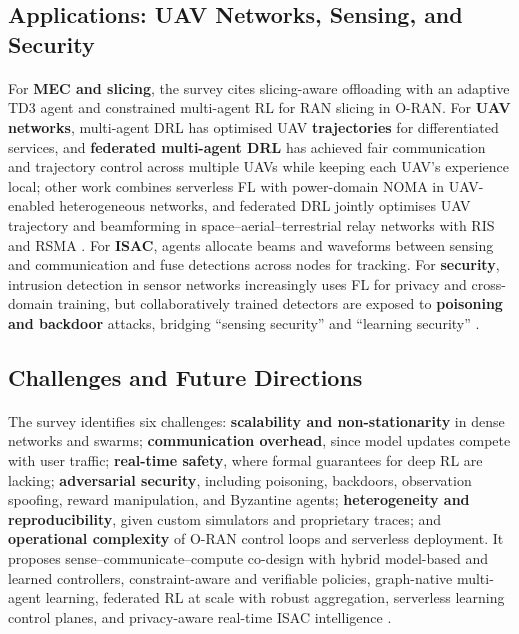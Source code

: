 \documentclass[12pt,a4paper,final]{extreport}
\begin{document}
\subsection{Applications: UAV Networks, Sensing, and Security}

\paragraph{} For \textbf{MEC and slicing}, the survey cites slicing-aware offloading with an adaptive TD3 agent and constrained multi-agent RL for RAN slicing in O-RAN. For \textbf{UAV networks}, multi-agent DRL has optimised UAV \textbf{trajectories} for differentiated services, and \textbf{federated multi-agent DRL} has achieved fair communication and trajectory control across multiple UAVs while keeping each UAV's experience local; other work combines serverless FL with power-domain NOMA in UAV-enabled heterogeneous networks, and federated DRL jointly optimises UAV trajectory and beamforming in space--aerial--terrestrial relay networks with RIS and RSMA \cite{p3}. For \textbf{ISAC}, agents allocate beams and waveforms between sensing and communication and fuse detections across nodes for tracking. For \textbf{security}, intrusion detection in sensor networks increasingly uses FL for privacy and cross-domain training, but collaboratively trained detectors are exposed to \textbf{poisoning and backdoor} attacks, bridging ``sensing security'' and ``learning security'' \cite{p3}.

\subsection{Challenges and Future Directions}

\paragraph{} The survey identifies six challenges: \textbf{scalability and non-stationarity} in dense networks and swarms; \textbf{communication overhead}, since model updates compete with user traffic; \textbf{real-time safety}, where formal guarantees for deep RL are lacking; \textbf{adversarial security}, including poisoning, backdoors, observation spoofing, reward manipulation, and Byzantine agents; \textbf{heterogeneity and reproducibility}, given custom simulators and proprietary traces; and \textbf{operational complexity} of O-RAN control loops and serverless deployment. It proposes sense--communicate--compute co-design with hybrid model-based and learned controllers, constraint-aware and verifiable policies, graph-native multi-agent learning, federated RL at scale with robust aggregation, serverless learning control planes, and privacy-aware real-time ISAC intelligence \cite{p3}.
\end{document}
